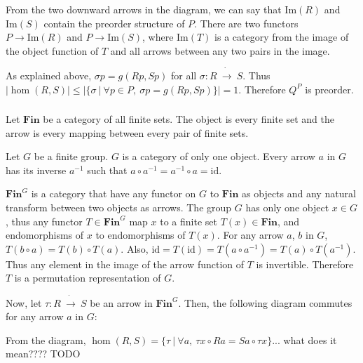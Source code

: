 \documentclass[luatex]{article}
\begin{document}
\begin{center}
\end{center}

From the two downward arrows in the diagram, we can say that $\mathrm{Im}(R)$ and $\mathrm{Im}(S)$ contain the preorder structure of $P$. There are two functors $P \rightarrow \mathrm{Im}(R)$ and $P \rightarrow \mathrm{Im}(S)$, where $\mathrm{Im}(T)$ is a category from the image of the object function of $T$ and all arrows between any two pairs in the image.

As explained above, $\sigma p = g(Rp, Sp)$ for all $\sigma : R\ \dot{\rightarrow}\ S$. Thus $|\hom(R, S)| \leq |\{\sigma\ |\ \forall p \in P,\ \sigma p = g(Rp, Sp)\}| = 1$. Therefore $Q^P$ is preorder.

\subsubsection{}



\showArt

Let $\mathbf{Fin}$ be a category of all finite sets. The object is every finite set and the arrow is every mapping between every pair of finite sets.

Let $G$ be a finite group. $G$ is a category of only one object. Every arrow $a$ in $G$ has its inverse $a^{-1}$ such that $a \circ a^{-1} = a^{-1} \circ a = \mathrm{id}$.

$\mathbf{Fin}^G$ is a category that have any functor on $G$ to $\mathbf{Fin}$ as objects and any natural transform between two objects as arrows. The group $G$ has only one object $x \in G$, thus any functor $T \in \mathbf{Fin}^G$ map $x$ to a finite set $T(x) \in \mathbf{Fin}$, and endomorphisms of $x$ to endomorphisms of $T(x)$. For any arrow $a$, $b$ in $G$, $T(b \circ a) = T(b) \circ T(a)$. Also, $\mathrm{id} = T(\mathrm{id}) = T(a \circ a^{-1}) = T(a) \circ T(a^{-1})$. Thus any element in the image of the arrow function of $T$ is invertible. Therefore $T$ is a permutation representation of $G$.

Now, let $\tau : R\ \dot{\rightarrow}\ S$ be an arrow in $\mathbf{Fin}^G$. Then, the following diagram commutes for any arrow $a$ in $G$:
\begin{center}
\end{center}
From the diagram, $\hom(R, S) = \{\tau\ |\ \forall a,\ \tau x \circ R a = S a \circ \tau x\}$... what does it mean???? TODO
\end{document}
